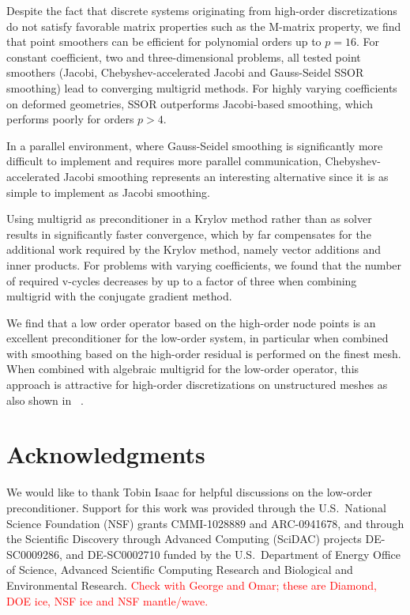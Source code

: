 \documentclass[smallcondensed,final]{svjour3}     %
\newcommand{\todo}[1]{\textcolor{red}{ #1}}
\begin{document}
Despite the fact that discrete systems originating from high-order
discretizations do not satisfy favorable matrix properties such as the
M-matrix property, we find that point smoothers can be efficient for
polynomial orders up to $p=16$.  For constant coefficient, two and
three-dimensional problems, all tested point smoothers (Jacobi,
Chebyshev-accelerated Jacobi and Gauss-Seidel SSOR smoothing) lead to
converging multigrid methods. For highly varying coefficients on
deformed geometries, SSOR outperforms Jacobi-based smoothing, which
performs poorly for orders $p>4$.

In a parallel environment, where Gauss-Seidel smoothing is
significantly more difficult to implement and requires more parallel
communication, Chebyshev-accelerated Jacobi smoothing represents an
interesting alternative since it is as simple to implement as Jacobi
smoothing.

Using multigrid as preconditioner in a Krylov method rather than as
solver results in significantly faster convergence, which by far
compensates for the additional work required by the Krylov method,
namely vector additions and inner products.  For problems with varying
coefficients, we found that the number of required v-cycles decreases
by up to a factor of three when combining multigrid with the conjugate
gradient method.

We find that a low order operator based on the high-order node points
is an excellent preconditioner for the low-order system, in particular
when combined with smoothing based on the high-order residual is
performed on the finest mesh.  When combined with algebraic multigrid
for the low-order operator, this approach is attractive for high-order
discretizations on unstructured meshes as also shown in
~\cite{Brown10, DevilleMund90, HeysManteuffelMcCormickEtAl05}.



\section*{Acknowledgments}
We would like to thank Tobin Isaac for helpful discussions on the
low-order preconditioner. Support for this work was
  provided through the U.S.~National Science Foundation (NSF) grants
  CMMI-1028889 and   %
  ARC-0941678,       %
 and through the Scientific Discovery through Advanced
  Computing (SciDAC) projects 
  DE-SC0009286,   %
  and DE-SC0002710 %
  funded by the U.S.~Department of Energy
  Office of Science, Advanced Scientific Computing Research and
  Biological and Environmental Research.
 \todo{Check with George and Omar; these are Diamond, DOE ice, NSF ice and NSF mantle/wave.}




\end{document}
